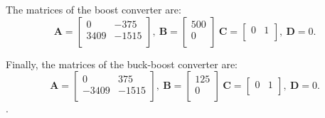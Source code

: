 \documentclass[runningheads,a4paper]{llncs}
\begin{document}
The matrices of the boost converter are:
$$
\textbf{A}=\left[\begin{array}{cc}
0		& -375 \\
3409	& -1515\\
\end{array}\right],~ \textbf{B} = \left[\begin{array}{c}
500 \\ 0 \\
\end{array}\right]~
\textbf{C}=\left[\begin{array}{cc}
0 & 1\\
\end{array}\right],~ \textbf{D}= 0.
$$

Finally, the matrices of the buck-boost converter are:
$$
\textbf{A}=\left[\begin{array}{cc}
0		& 375 \\
-3409	& -1515\\
\end{array}\right],~ \textbf{B} = \left[\begin{array}{c}
125 \\ 0 \\
\end{array}\right]~
\textbf{C}=\left[\begin{array}{cc}
0 & 1\\
\end{array}\right],~ \textbf{D}= 0.
$$.
\end{document}
